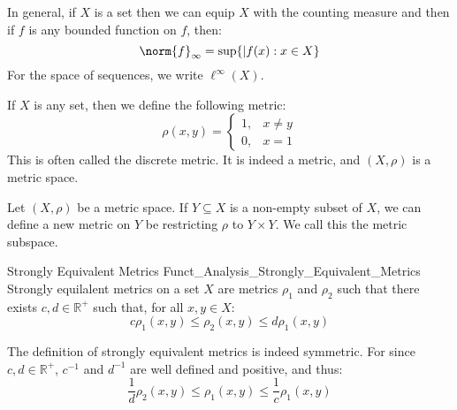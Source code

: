 \documentclass[crop=false,class=book,oneside]{standalone}                      %
\begin{document}
            In general, if $X$ is a set then we can equip $X$
            with the counting measure and then if $f$ is any
            bounded function on $f$, then:
            \begin{equation}
                \norm{f}_{\infty}=\sup\{|f(x):x\in{X}\}
            \end{equation}
            For the space of sequences, we write $\ell^{\infty}(X)$.
            \begin{lexample}
                If $X$ is any set, then we define the following
                metric:
                \begin{equation}
                    \rho(x,y)=
                    \begin{cases}
                        1,&x\ne{y}\\
                        0,&x=1
                    \end{cases}
                \end{equation}
                This is often called the discrete metric. It is
                indeed a metric, and $(X,\rho)$ is a metric space.
            \end{lexample}
            \begin{lexample}
                Let $(X,\rho)$ be a metric space. If $Y\subseteq{X}$
                is a non-empty subset of $X$, we can define a new
                metric on $Y$
                be restricting $\rho$ to $Y\times{Y}$. We call
                this the metric subspace.
            \end{lexample}
            \begin{ldefinition}{Strongly Equivalent Metrics}
                  {Funct_Analysis_Strongly_Equivalent_Metrics}
                Strongly equilalent metrics on a set $X$ are metrics
                $\rho_{1}$ and $\rho_{2}$ such that there
                exists $c,d\in\mathbb{R}^{+}$ such that, for
                all $x,y\in{X}$:
                \begin{equation}
                    c\rho_{1}(x,y)\leq
                        \rho_{2}(x,y)\leq{d}\rho_{1}(x,y)
                \end{equation}
            \end{ldefinition}
            The definition of strongly equivalent metrics is indeed
            symmetric. For since $c,d\in\mathbb{R}^{+}$,
            $c^{-1}$ and $d^{-1}$ are well defined and positive,
            and thus:
            \begin{equation}
                \frac{1}{d}\rho_{2}(x,y)\leq\rho_{1}(x,y)
                \leq\frac{1}{c}\rho_{1}(x,y)
            \end{equation}
\end{document}
